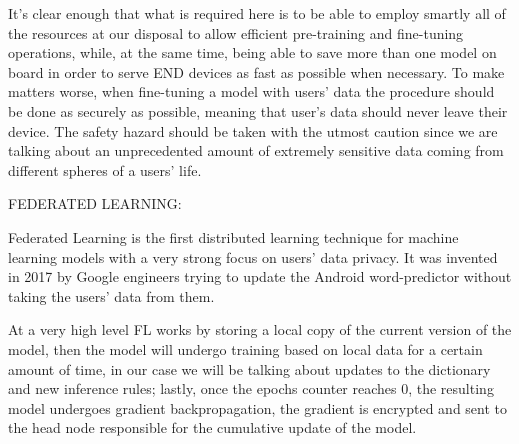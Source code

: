 It's clear enough that what is required here is to be able to employ smartly all of the resources at
our disposal to allow efficient pre-training and fine-tuning operations, while, at the same
time, being able to save more than one model on board in order to serve END devices as fast as
possible when necessary. To make matters worse, when fine-tuning a model with users' data the
procedure should be done as securely as possible, meaning that user's data should never leave their
device. The safety hazard should be taken with the utmost caution since we are talking about an
unprecedented amount of extremely sensitive data coming from different spheres of a users' life.

\bigskip
\noindent
FEDERATED LEARNING:

Federated Learning is the first distributed learning technique for machine learning models with a
very strong focus on users' data privacy. It was invented in 2017 by Google engineers trying to
update the Android word-predictor without taking the users' data from them.

At a very high level FL works by storing a local copy of the current version of the model, then the
model will undergo training based on local data for a certain amount of time, in our case we will be talking about updates to the dictionary and new
inference rules; lastly, once the epochs counter reaches 0, the resulting model undergoes
gradient backpropagation, the gradient is encrypted and sent to the head node responsible for the
cumulative update of the model.

